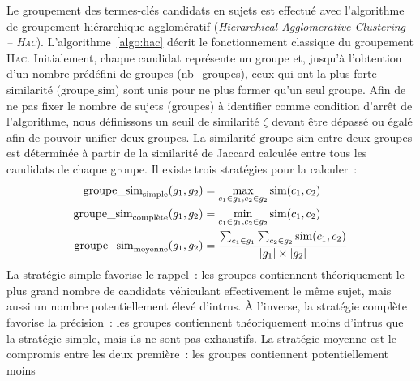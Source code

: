         Le groupement des termes-clés candidats en sujets est effectué avec
        l'algorithme de groupement hiérarchique agglomératif
        (\textit{Hierarchical Agglomerative Clustering -- \textsc{Hac}}).
        L'algorithme~\ref{algo:hac} décrit le fonctionnement classique du
        groupement \textsc{Hac}. Initialement, chaque candidat représente un
        groupe et, jusqu'à l'obtention d'un nombre prédéfini de groupes
        (nb\_groupes), ceux qui ont la plus forte similarité ($\text{groupe\_sim}$) sont
        unis pour ne plus former qu'un seul groupe. Afin de ne pas fixer le
        nombre de sujets (groupes) à identifier comme condition d'arrêt de
        l'algorithme, nous définissons un seuil de similarité $\zeta$ devant
        être dépassé ou égalé afin de pouvoir unifier deux groupes. La
        similarité $\text{groupe\_sim}$ entre deux groupes est déterminée à partir de la similarité
        de Jaccard calculée entre tous les candidats de chaque groupe. Il existe
        trois stratégies pour la calculer~:
        \begin{align}
          \textnormal{groupe\_sim}_{\textnormal{simple}}(g_1, g_2) &= \max_{c_1 \in g_1, c_2 \in g_2} \textnormal{sim}(c_1, c_2)\\
          \textnormal{groupe\_sim}_{\textnormal{complète}}(g_1, g_2) &= \min_{c_1 \in g_1, c_2 \in g_2} \textnormal{sim}(c_1, c_2)\\
            \textnormal{groupe\_sim}_{\textnormal{moyenne}}(g_1, g_2) &= \frac{\sum_{c_1 \in g_1}\sum_{c_2 \in g_2} \textnormal{sim}(c_1, c_2)}{|g_1| \times |g_2|}
        \end{align}
        La stratégie simple favorise le rappel~: les groupes contiennent
        théoriquement le plus grand nombre de candidats véhiculant effectivement
        le même sujet, mais aussi un nombre potentiellement élevé d'intrus. À
        l'inverse, la stratégie complète favorise la précision~: les groupes
        contiennent théoriquement moins d'intrus que la stratégie simple, mais
        ils ne sont pas exhaustifs. La stratégie moyenne est le compromis entre
        les deux première~: les groupes contiennent potentiellement moins
